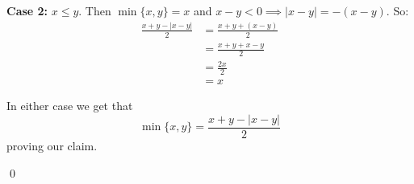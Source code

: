\documentclass[addpoints,answers]{exam}
\begin{document}
\begin{questions}
\begin{parts}
\begin{solution}
      \textbf{Case 2:} $x\leq y$. Then $\min\{x,y\} = x$ and $x-y < 0 \implies |x-y| = -(x-y)$. So:
      \begin{align*}
        \frac{x + y - |x-y|}{2} &= \frac{x + y + (x-y)}2\\
        &= \frac{x + y + x - y}{2}\\
        &= \frac{2x}{2}\\
        &= x
      \end{align*}

      In either case we get that 
    \[
      \min\{x,y\} = \frac{x+y-|x-y|}{2}
    \]
    proving our claim.

    \qed
    \end{solution}
  \end{parts}
\end{questions}
\end{document}
